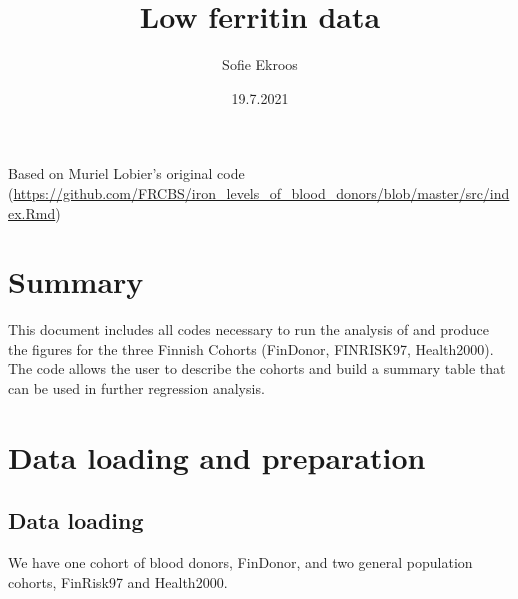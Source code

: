 \documentclass[
]{article}
\title{Low ferritin data}
\author{Sofie Ekroos}
\date{19.7.2021}
\newenvironment{Shaded}{\begin{snugshade}}{\end{snugshade}}
\newcommand{\AttributeTok}[1]{\textcolor[rgb]{0.77,0.63,0.00}{#1}}
\newcommand{\ConstantTok}[1]{\textcolor[rgb]{0.00,0.00,0.00}{#1}}
\newcommand{\FunctionTok}[1]{\textcolor[rgb]{0.00,0.00,0.00}{#1}}
\newcommand{\NormalTok}[1]{#1}
\newcommand{\SpecialCharTok}[1]{\textcolor[rgb]{0.00,0.00,0.00}{#1}}
\begin{document}
\maketitle

Based on Muriel Lobier's original code
(\url{https://github.com/FRCBS/iron_levels_of_blood_donors/blob/master/src/index.Rmd})

\hypertarget{summary}{%
\section{Summary}\label{summary}}

This document includes all codes necessary to run the analysis of and
produce the figures for the three Finnish Cohorts (FinDonor, FINRISK97,
Health2000). The code allows the user to describe the cohorts and build
a summary table that can be used in further regression analysis.

\begin{Shaded}
\end{Shaded}

\hypertarget{data-loading-and-preparation}{%
\section{Data loading and
preparation}\label{data-loading-and-preparation}}

\hypertarget{data-loading}{%
\subsection{Data loading}\label{data-loading}}

We have one cohort of blood donors, FinDonor, and two general population
cohorts, FinRisk97 and Health2000.
\end{document}
